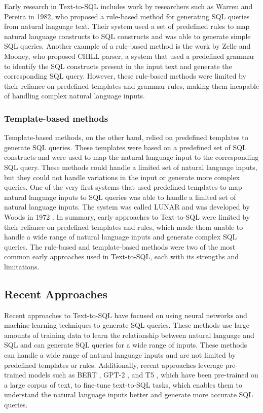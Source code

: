 Early research in Text-to-SQL includes work by researchers such as Warren and Pereira in 1982\cite{Warren1982AnEE}, who proposed a rule-based method for generating SQL queries from natural language text. Their system used a set of predefined rules to map natural language constructs to SQL constructs and was able to generate simple SQL queries. Another example of a rule-based method is the work by Zelle and Mooney, who proposed CHILL parser\cite{Zelle1996LearningTP}, a system that used a predefined grammar to identify the SQL constructs present in the input text and generate the corresponding SQL query. However, these rule-based methods were limited by their reliance on predefined templates and grammar rules, making them incapable of handling complex natural language inputs.

\subsubsection{Template-based methods}

Template-based methods, on the other hand, relied on predefined templates to generate SQL queries. These templates were based on a predefined set of SQL constructs and were used to map the natural language input to the corresponding SQL query. These methods could handle a limited set of natural language inputs, but they could not handle variations in the input or generate more complex queries. One of the very first systems that used predefined templates to map natural language inputs to SQL queries was able to handle a limited set of natural language inputs. The system was called LUNAR and was developed by Woods in 1972 \cite{lunar}.
In summary, early approaches to Text-to-SQL were limited by their reliance on predefined templates and rules, which made them unable to handle a wide range of natural language inputs and generate complex SQL queries. The rule-based and template-based methods were two of the most common early approaches used in Text-to-SQL, each with its strengths and limitations.

\subsection{Recent Approaches}

Recent approaches to Text-to-SQL have focused on using neural networks and machine learning techniques to generate SQL queries. These methods use large amounts of training data to learn the relationship between natural language and SQL and can generate SQL queries for a wide range of inputs. These methods can handle a wide range of natural language inputs and are not limited by predefined templates or rules. Additionally, recent approaches leverage pre-trained models such as \ac{BERT} \cite{devlin-etal-2019-bert}, GPT-2 \cite{radford2019language}, and T5 \cite{raffel_exploring_2020}, which have been pre-trained on a large corpus of text, to fine-tune text-to-SQL tasks, which enables them to understand the natural language inputs better and generate more accurate SQL queries.

